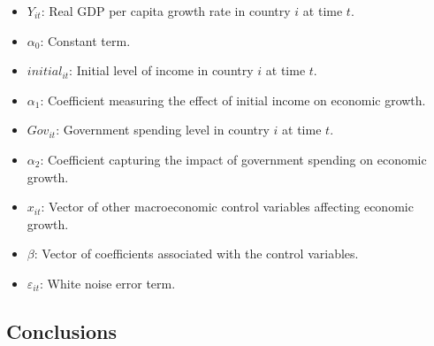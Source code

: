 \documentclass[10pt, oneside]{article}
\begin{document}
\begin{itemize}
	\item $Y_{it}$: Real GDP per capita growth rate in country $i$ at time $t$.
	\item $\alpha_0$: Constant term.
	\item $initial_{it}$: Initial level of income in country $i$ at time $t$.
	\item $\alpha_1$: Coefficient measuring the effect of initial income on economic growth.
	\item $Gov_{it}$: Government spending level in country $i$ at time $t$.
	\item $\alpha_2$: Coefficient capturing the impact of government spending on economic growth.
	\item $x_{it}$: Vector of other macroeconomic control variables affecting economic growth.
	\item $\beta$: Vector of coefficients associated with the control variables.
	\item $\varepsilon_{it}$: White noise error term.
\end{itemize}

\subsection{Conclusions}
\end{document}
